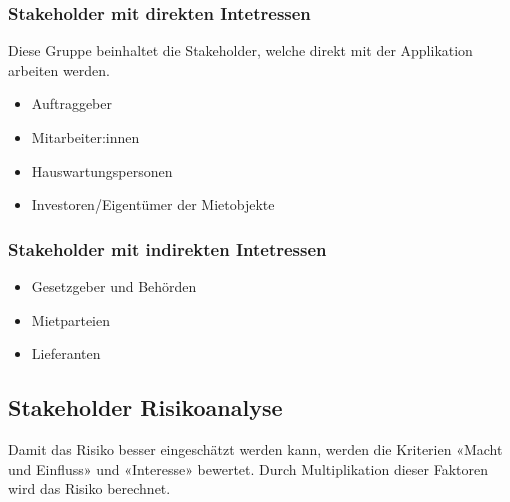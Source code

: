 \subsubsection{Stakeholder mit direkten Intetressen}
Diese Gruppe beinhaltet die Stakeholder, welche direkt mit der Applikation arbeiten werden.

\begin{itemize}
  \item Auftraggeber
  \item Mitarbeiter:innen
  \item Hauswartungspersonen
  \item Investoren/Eigentümer der Mietobjekte
\end{itemize}

\subsubsection{Stakeholder mit indirekten Intetressen}

\begin{itemize}
  \item Gesetzgeber und Behörden
  \item Mietparteien
  \item Lieferanten
\end{itemize}

\newpage
\subsection{Stakeholder Risikoanalyse}
Damit das Risiko besser eingeschätzt werden kann, werden die Kriterien «Macht und Einfluss» und «Interesse» bewertet. Durch Multiplikation dieser Faktoren wird das Risiko berechnet.


